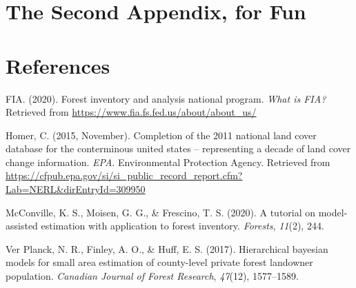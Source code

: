\documentclass[12pt,twoside]{reedthesis}
\begin{document}
\hypertarget{the-second-appendix-for-fun}{%
\chapter{The Second Appendix, for Fun}\label{the-second-appendix-for-fun}}

\backmatter

\hypertarget{references}{%
\chapter*{References}\label{references}}


\noindent

\setlength{\parindent}{-0.20in}
\setlength{\leftskip}{0.20in}
\setlength{\parskip}{8pt}

\hypertarget{refs}{}
\leavevmode\hypertarget{ref-whatisfia}{}%
FIA. (2020). Forest inventory and analysis national program. \emph{What is FIA?} Retrieved from \url{https://www.fia.fs.fed.us/about/about_us/}

\leavevmode\hypertarget{ref-nlcd11}{}%
Homer, C. (2015, November). Completion of the 2011 national land cover database for the conterminous united states -- representing a decade of land cover change information. \emph{EPA}. Environmental Protection Agency. Retrieved from \url{https://cfpub.epa.gov/si/si_public_record_report.cfm?Lab=NERL\&dirEntryId=309950}

\leavevmode\hypertarget{ref-mcconville2020}{}%
McConville, K. S., Moisen, G. G., \& Frescino, T. S. (2020). A tutorial on model-assisted estimation with application to forest inventory. \emph{Forests}, \emph{11}(2), 244.

\leavevmode\hypertarget{ref-ver2017}{}%
Ver Planck, N. R., Finley, A. O., \& Huff, E. S. (2017). Hierarchical bayesian models for small area estimation of county-level private forest landowner population. \emph{Canadian Journal of Forest Research}, \emph{47}(12), 1577--1589.


\end{document}
